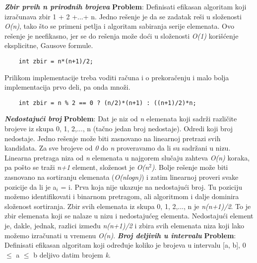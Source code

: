 \documentclass{article}
\begin{document}
\textit{\textbf{Zbir prvih n prirodnih brojeva}}
\newline \textbf{Problem}: Definisati efikasan algoritam koji izračunava zbir 1 + 2 +...+ n.
\newline Jedno rešenje je da se zadatak reši u složenosti \textit{O(n)}, tako što se primeni petlja i algoritam sabiranja serije elemenata. Ovo rešenje je neefikasno, jer se do rešenja može doći u složenosti \textit{O(1)} korišćenje eksplicitne, Gausove formule.
\begin{lstlisting}
    int zbir = n*(n+1)/2;
\end{lstlisting}
Prilikom implementacije treba voditi računa i o prekoračenju i malo bolja
implementacija prvo deli, pa onda množi.
\begin{lstlisting}
    int zbir = n % 2 == 0 ? (n/2)*(n+1) : ((n+1)/2)*n;
\end{lstlisting}
\vspace{0.2cm} \newline \textbf{\textit{Nedostajući broj}}
\newline \textbf{Problem}: Dat je niz od \textit{n} elemenata koji sadrži različite brojeve iz skupa 0, 1, 2,..., n (tačno jedan broj nedostaje). Odredi koji broj nedostaje.
\newline Jedno rešenje može biti zasnovano na linearnoj pretrazi svih kandidata. Za sve
brojeve od \textit{0} do \textit{n} proveravamo da li su sadržani u nizu. Linearna pretraga niza
od \textit{n} elemenata u najgorem slučaju zahteva \textit{O(n)} koraka, pa pošto se traži \textit{n+1}
element, složenost je \textit{O(n$^2$)}.
\newline Bolje rešenje može biti zasnovano na sortiranju elemenata 
(\textit{O(nlogn)}) i zatim linearnoj proveri svake pozicije da li je 
a$_i$ = i.
Prva koja nije ukazuje na nedostajući broj. Tu poziciju možemo identifikovati
i binarnom pretragom, ali algoritmom i dalje dominira složenost sortiranja. Zbir svih elemenata iz skupa {0, 1, 2,..., n} je \textit{n(n+1)/2}. To
je zbir elemenata koji se nalaze u nizu i nedostajućeg elementa. Nedostajući element je, dakle, jednak, razlici između \textit{n(n+1)/2} i zbira svih elemenata niza koji lako možemo izračunati u vremenu \textit{O(n)}.
\vspace{0.2cm} \newline \textbf{\textit{Broj deljivih u intervalu}}
\newline \textbf{Problem}: Definisati efikasan algoritam koji određuje koliko je brojeva u intervalu [a, b], 0 $\leq$ a $\leq$ b deljivo datim brojem \textit{k}.
\end{document}
